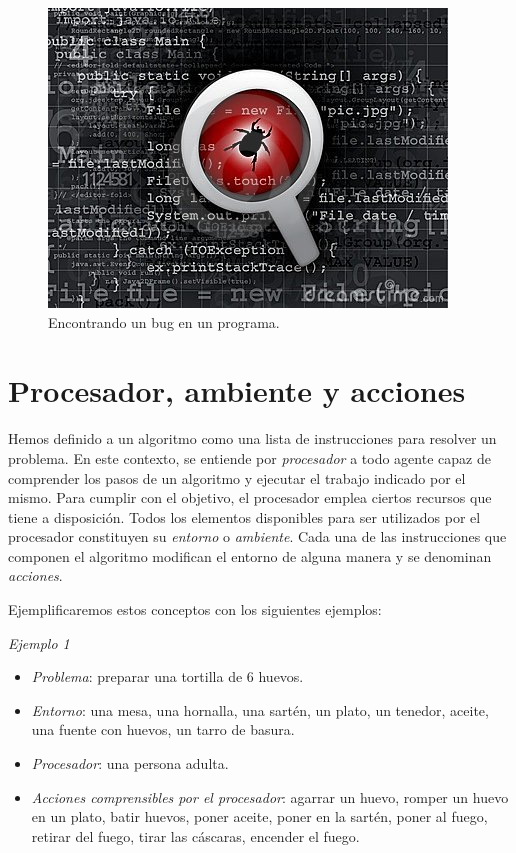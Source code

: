 \documentclass[
]{book}
\providecommand{\tightlist}{%
  \setlength{\itemsep}{0pt}\setlength{\parskip}{0pt}}
\begin{document}
\begin{figure}

{\centering \includegraphics[width=0.5\linewidth]{images/intro/08_bug} 

}

\caption{Encontrando un bug en un programa.}\label{fig:bug}
\end{figure}

\hypertarget{procesador-ambiente-y-acciones}{%
\section{Procesador, ambiente y acciones}\label{procesador-ambiente-y-acciones}}

Hemos definido a un algoritmo como una lista de instrucciones para resolver un problema. En este contexto, se entiende por \emph{procesador} a todo agente capaz de comprender los pasos de un algoritmo y ejecutar el trabajo indicado por el mismo. Para cumplir con el objetivo, el procesador emplea ciertos recursos que tiene a disposición. Todos los elementos disponibles para ser utilizados por el procesador constituyen su \emph{entorno} o \emph{ambiente}. Cada una de las instrucciones que componen el algoritmo modifican el entorno de alguna manera y se denominan \emph{acciones}.

Ejemplificaremos estos conceptos con los siguientes ejemplos:

\emph{Ejemplo 1}

\begin{itemize}
\tightlist
\item
  \emph{Problema}: preparar una tortilla de 6 huevos.
\item
  \emph{Entorno}: una mesa, una hornalla, una sartén, un plato, un tenedor, aceite, una fuente con huevos, un tarro de basura.
\item
  \emph{Procesador}: una persona adulta.
\item
  \emph{Acciones comprensibles por el procesador}: agarrar un huevo, romper un huevo en un plato, batir huevos, poner aceite, poner en la sartén, poner al fuego, retirar del fuego, tirar las cáscaras, encender el fuego.
\end{itemize}
\end{document}
